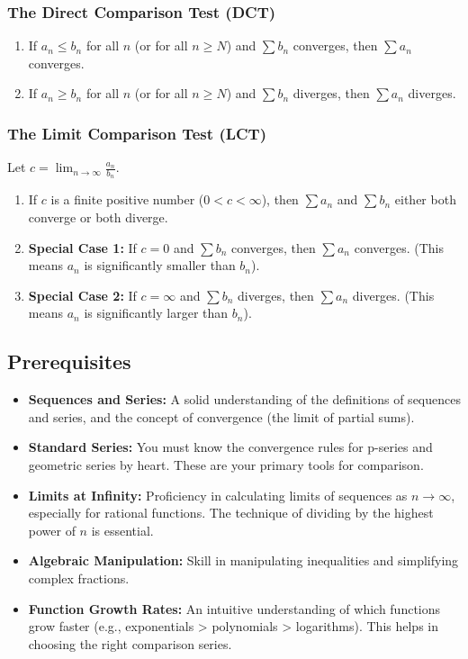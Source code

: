 \documentclass{article}
\begin{document}
\subsubsection{The Direct Comparison Test (DCT)}
\begin{enumerate}
    \item If \(a_n \leq b_n\) for all \(n\) (or for all \(n \geq N\)) and \(\sum b_n\) converges, then \(\sum a_n\) converges.
    \item If \(a_n \geq b_n\) for all \(n\) (or for all \(n \geq N\)) and \(\sum b_n\) diverges, then \(\sum a_n\) diverges.
\end{enumerate}

\subsubsection{The Limit Comparison Test (LCT)}
Let \( c = \lim_{n \to \infty} \frac{a_n}{b_n} \).
\begin{enumerate}
    \item If \(c\) is a finite positive number (\(0 < c < \infty\)), then \(\sum a_n\) and \(\sum b_n\) either both converge or both diverge.
    \item \textbf{Special Case 1:} If \(c = 0\) and \(\sum b_n\) converges, then \(\sum a_n\) converges. (This means \(a_n\) is significantly smaller than \(b_n\)).
    \item \textbf{Special Case 2:} If \(c = \infty\) and \(\sum b_n\) diverges, then \(\sum a_n\) diverges. (This means \(a_n\) is significantly larger than \(b_n\)).
\end{enumerate}

\subsection{Prerequisites}
\begin{itemize}
    \item \textbf{Sequences and Series:} A solid understanding of the definitions of sequences and series, and the concept of convergence (the limit of partial sums).
    \item \textbf{Standard Series:} You must know the convergence rules for p-series and geometric series by heart. These are your primary tools for comparison.
    \item \textbf{Limits at Infinity:} Proficiency in calculating limits of sequences as \(n \to \infty\), especially for rational functions. The technique of dividing by the highest power of \(n\) is essential.
    \item \textbf{Algebraic Manipulation:} Skill in manipulating inequalities and simplifying complex fractions.
    \item \textbf{Function Growth Rates:} An intuitive understanding of which functions grow faster (e.g., exponentials > polynomials > logarithms). This helps in choosing the right comparison series.
\end{itemize}
\end{document}
